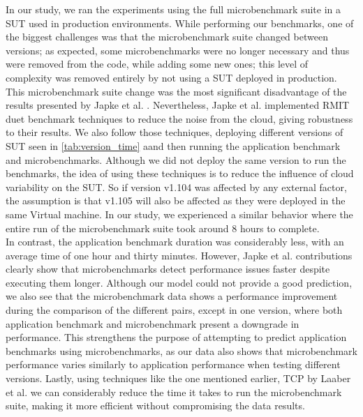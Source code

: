 In our study, we ran the experiments using the full microbenchmark suite in a \ac{SUT} used in production environments. While performing our benchmarks, one of the biggest challenges was that the microbenchmark suite changed between versions; as expected, some microbenchmarks were no longer necessary and thus were removed from the code, while adding some new ones; this level of complexity was removed entirely by not using a \ac{SUT} deployed in production. This microbenchmark suite change was the most significant disadvantage of the results presented by Japke et al. \cite{japke2023earlymicrobenchmarkcatches}. Nevertheless, Japke et al. \cite{japke2023earlymicrobenchmarkcatches} implemented \ac{RMIT} duet benchmark techniques to reduce the noise from the cloud, giving robustness to their results. We also follow those techniques, deploying different versions of \ac{SUT} seen in \cref{tab:version_time} aand then running the application benchmark and microbenchmarks. Although we did not deploy the same version to run the benchmarks, the idea of using these techniques is to reduce the influence of cloud variability on the \ac{SUT}. So if version v1.104 was affected by any external factor, the assumption is that v1.105 will also be affected as they were deployed in the same Virtual machine. In our study, we experienced a similar behavior where the entire run of the microbenchmark suite took around 8 hours to complete. \\ 
In contrast, the application benchmark duration was considerably less, with an average time of one hour and thirty minutes. However, Japke et al. \cite{japke2023earlymicrobenchmarkcatches} contributions clearly show that microbenchmarks detect performance issues faster despite executing them longer. Although our model could not provide a good prediction, we also see that the microbenchmark data shows a performance improvement during the comparison of the different pairs, except in one version, where both application benchmark and microbenchmark present a downgrade in performance. This strengthens the purpose of attempting to predict application benchmarks using microbenchmarks, as our data also shows that microbenchmark performance varies similarly to application performance when testing different versions. Lastly, using techniques like the one mentioned earlier, \ac{TCP} by Laaber et al. \cite{laaber2021applyingtcp} we can considerably reduce the time it takes to run the microbenchmark suite, making it more efficient without compromising the data results.  \\
